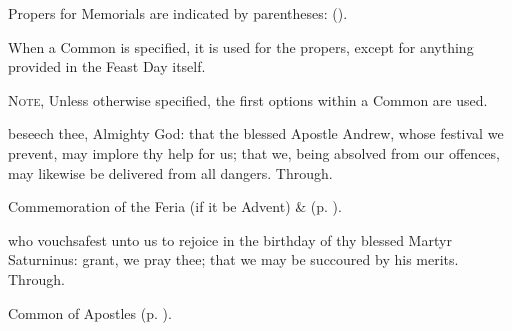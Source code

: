 \fancyhead[RO,LE]{}
\fancyhead[RE,LO]{}
{}

\begin{rubric}
	Propers for Memorials are indicated by parentheses: ().
\end{rubric}

\begin{rubric}
	When a Common is specified, it is used for the propers, except for anything provided in the Feast Day itself.
	
	\textsc{Note,} Unless otherwise specified, the first options within a Common are used.
\end{rubric}



 beseech thee, Almighty God: that the blessed Apostle Andrew, whose festival we prevent, may implore thy help for us; that we, being absolved from our offences, may likewise be delivered from all dangers. Through.

\begin{rubric}
	Commemoration of the Feria (if it be Advent) \&  (p. \pageref{SaturninusCollect}).
\end{rubric}



\memorialCollect\label{SaturninusCollect}
 who vouchsafest unto us to rejoice in the birthday of thy blessed Martyr Saturninus: grant, we pray thee; that we may be succoured by his merits. Through.



\begin{rubric}
	Common of Apostles (p. \pageref{CommonApostles}).
\end{rubric}


\firstEvensong
{}

